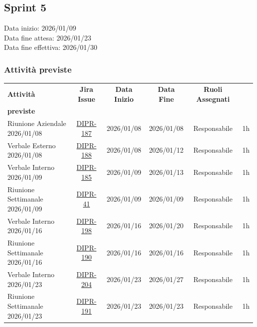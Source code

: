 \documentclass[a4paper,12pt]{article}
\begin{document}
\subsection{Sprint 5}
Data inizio: 2026/01/09\\
Data fine attesa: 2026/01/23\\
Data fine effettiva: 2026/01/30

\subsubsection{Attività previste}
\small
{}
\begin{longtable}{|p{4cm}|c|c|c|c|c|}
    \hline
    \rowcolor{zpusgreen!30}
    \textbf{Attività} & \textbf{Jira Issue} & \textbf{Data Inizio} & \textbf{Data Fine} & \textbf{Ruoli Assegnati} & \begin{tabular}[c]{@{}c@{}} \textbf{Ore} \\ \textbf{previste} \end{tabular} \\
    \hline
    Riunione Aziendale 2026/01/08 & \href{https://7zpus.atlassian.net/browse/DIPR-187}{DIPR-187}& 2026/01/08 & 2026/01/08 & Responsabile & 1h \\
    \hline
    Verbale Esterno 2026/01/08 & \href{https://7zpus.atlassian.net/browse/DIPR-188}{DIPR-188}& 2026/01/08 & 2026/01/12 & Responsabile & 1h \\
    \hline
    Verbale Interno 2026/01/09 & \href{https://7zpus.atlassian.net/browse/DIPR-185}{DIPR-185}& 2026/01/09 & 2026/01/13 & Responsabile & 1h \\
    \hline
    Riunione Settimanale 2026/01/09 & \href{https://7zpus.atlassian.net/browse/DIPR-41}{DIPR-41}& 2026/01/09 & 2026/01/09 & Responsabile & 1h \\
    \hline
    Verbale Interno 2026/01/16 & \href{https://7zpus.atlassian.net/browse/DIPR-198}{DIPR-198}& 2026/01/16 & 2026/01/20 & Responsabile & 1h \\
    \hline
    Riunione Settimanale 2026/01/16 & \href{https://7zpus.atlassian.net/browse/DIPR-190}{DIPR-190}& 2026/01/16 & 2026/01/16 & Responsabile & 1h \\
    \hline
    Verbale Interno 2026/01/23 & \href{https://7zpus.atlassian.net/browse/DIPR-204}{DIPR-204}& 2026/01/23 & 2026/01/27 & Responsabile & 1h \\
    \hline
    Riunione Settimanale 2026/01/23 & \href{https://7zpus.atlassian.net/browse/DIPR-191}{DIPR-191} & 2026/01/23 & 2026/01/23 & Responsabile & 1h \\

\end{longtable}
\end{document}
